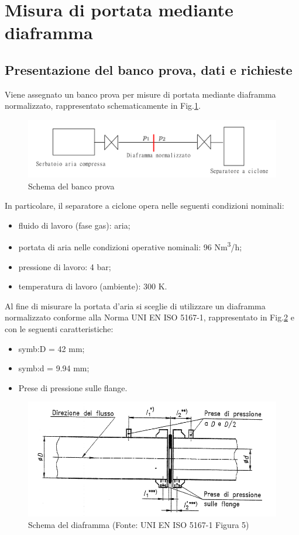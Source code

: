 \section{Misura di portata mediante diaframma}
\subsection{Presentazione del banco prova, dati e richieste}
Viene assegnato un banco prova per misure di portata mediante diaframma normalizzato, rappresentato schematicamente in Fig.\ref{fig:schemabancoprova}. 

\begin{figure} [H]
	\centering
	\includegraphics[width=\linewidth]{chapters/3-misuradiaframma/schemabancoprova}
	\caption{Schema del banco prova}
	\label{fig:schemabancoprova}
\end{figure}

In particolare, il separatore a ciclone opera nelle seguenti condizioni nominali:
\begin{itemize}
	\item fluido di lavoro (fase gas): aria;
	\item portata di aria nelle condizioni operative nominali: 96 Nm\textsuperscript{3}/h;
	\item pressione di lavoro: 4 bar;
	\item temperatura di lavoro (ambiente): 300 K.
\end{itemize}

Al fine di misurare la portata d'aria si sceglie di utilizzare un diaframma normalizzato conforme alla Norma UNI EN ISO 5167-1, rappresentato in Fig.\ref{fig:schemadiaframma} e con le seguenti caratteristiche: 
\begin{itemize}
	\item \gls{symb:D} = 42 mm;
	\item \gls{symb:d} = 9.94 mm;
	\item Prese di pressione sulle flange.
\end{itemize}

\begin{figure} [H]
	\centering
	\includegraphics[width=0.7\linewidth]{chapters/3-misuradiaframma/schemadiaframma}
	\caption{Schema del diaframma (Fonte: UNI EN ISO 5167-1 Figura 5)}
	\label{fig:schemadiaframma}
\end{figure}

